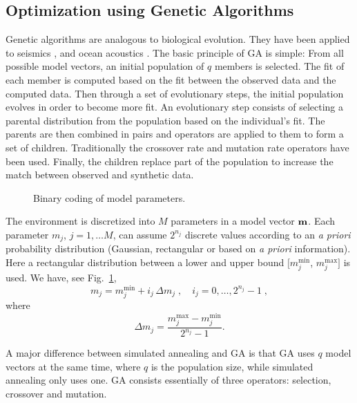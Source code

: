 \documentclass{saclantc}
\begin{document}
\subsection{Optimization using Genetic Algorithms}
\noindent

Genetic algorithms are  analogous  to biological evolution.
They have been applied to  seismics
\cite{scales:jcp92,sambrigde:gji92,stoffa:g91,sen:gji92}, and
 ocean acoustics \cite{gerstoft:asa94,jesus:jca96,eliza:ecua3,lotsberg:ecua3,rendas:icassp97}.
The basic principle of  GA is simple: From all possible model
vectors, an initial population of $q $ members is selected. The
fit of each member is computed based on the fit between the
observed data and the computed data.  Then through a set of
evolutionary steps, the initial population evolves in order to become
more fit. An evolutionary step consists of selecting a parental
distribution from the population based on the individual's
fit. The parents are then combined in pairs and operators are
applied to them to form a set of children. Traditionally the crossover
rate and mutation rate operators have been used.  Finally, the
children replace part of the population to increase the match between
observed and synthetic data.

\begin{figure}
\epsfxsize=11cm
\centerline{}
\caption{Binary coding of model parameters.}
\label{fig:CODE}
\end{figure}

The environment is discretized into $M$ parameters in a model vector $\bf m$.
Each parameter $m_j$, $ j=1, \ldots M$, can assume $2^{n_j}$ discrete
values according to  an {\it  a priori} probability distribution (Gaussian,
rectangular or based on {\it a priori } information). Here a
rectangular distribution between a lower and upper bound
 $[m_j^{\min}$, $ m_j^{\max}]$ is used. We have, see Fig.~\ref{fig:CODE}, 
\begin{equation}
 m_{j}=m^{\min}_j +i_j \, \Delta m_j
               \;,  \,\;\;\;i_j=0,\ldots,2^{n_j} -1\;,
\label{eq:disc}
\end{equation} 
where 
\begin{equation}
 \Delta m_j= \frac{m^{\max}_j-m^{\min}_j}{2^{n_j}-1}.
\end{equation}

A major difference between simulated annealing and GA is that GA 
uses $ q$ model vectors at the same time, where $q $ is the
population size, while simulated annealing only uses one. GA consists
essentially of three operators: selection, crossover and mutation.
\end{document}
